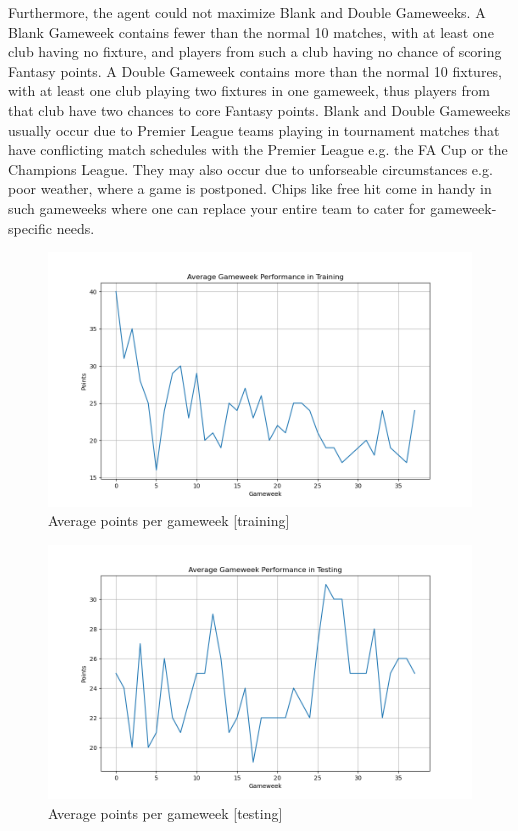 Furthermore, the agent could not maximize Blank and Double Gameweeks. A Blank Gameweek contains fewer than the normal 10 matches, with at least one club having no fixture, and players from such a club having no chance of scoring Fantasy points. A Double Gameweek contains more than the normal 10 fixtures, with at least one club playing two fixtures in one gameweek, thus players from that club have two chances to core Fantasy points. Blank and Double Gameweeks usually occur due to Premier League teams playing in tournament matches that have conflicting match schedules with the Premier League e.g. the FA Cup or the Champions League. They may also occur due to unforseable circumstances e.g. poor weather, where a game is postponed. Chips like free hit come in handy in such gameweeks where one can replace your entire team to cater for gameweek-specific needs.

\begin{figure}[h]
    \centering
    \includegraphics[width=1.0\textwidth]{figs/train_average_gameweek_performance.png}
    \vskip 0.2in
    \caption{Average points per gameweek [training]}
    \label{fig:train_average_gameweek_performance}
\end{figure}

\begin{figure}[h]
    \centering
    \includegraphics[width=1.0\textwidth]{figs/test_average_gameweek_performance.png}
    \vskip 0.2in
    \caption{Average points per gameweek [testing]}
    \label{fig:test_average_gameweek_performance}
\end{figure}

